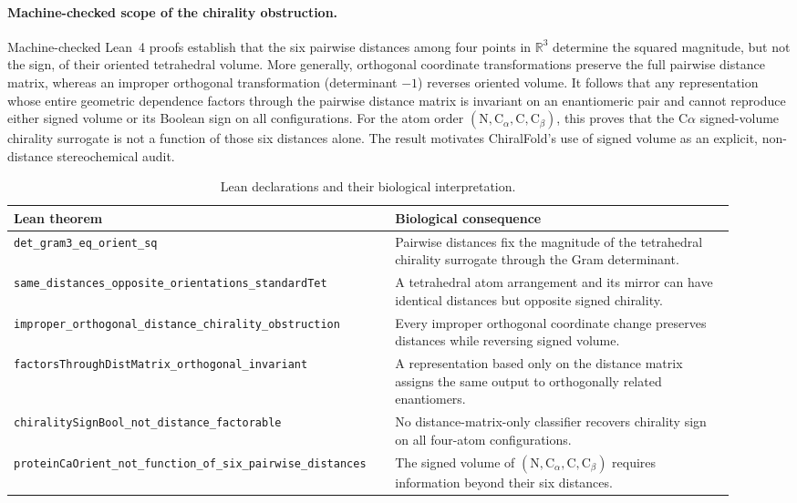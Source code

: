 \paragraph{Machine-checked scope of the chirality obstruction.}
Machine-checked Lean~4 proofs establish that the six pairwise distances among
four points in $\mathbb{R}^3$ determine the squared magnitude, but not the sign,
of their oriented tetrahedral volume.  More generally, orthogonal coordinate
transformations preserve the full pairwise distance matrix, whereas an improper
orthogonal transformation (determinant $-1$) reverses oriented volume.  It
follows that any representation whose entire geometric dependence factors
through the pairwise distance matrix is invariant on an enantiomeric pair and
cannot reproduce either signed volume or its Boolean sign on all configurations.
For the atom order $(\mathrm{N},\mathrm{C}_{\alpha},\mathrm{C},\mathrm{C}_{\beta})$,
this proves that the C$\alpha$ signed-volume chirality surrogate is not a
function of those six distances alone.  The result motivates ChiralFold's use of
signed volume as an explicit, non-distance stereochemical audit.

\begin{table}[t]
\centering
\caption{Lean declarations and their biological interpretation.}
\begin{tabular}{p{0.47\linewidth} p{0.45\linewidth}}
\hline
Lean theorem & Biological consequence \\
\hline
\texttt{det\_gram3\_eq\_orient\_sq} & Pairwise distances fix the magnitude of the tetrahedral chirality surrogate through the Gram determinant. \\
\texttt{same\_distances\_opposite\_orientations\_standardTet} & A tetrahedral atom arrangement and its mirror can have identical distances but opposite signed chirality. \\
\texttt{improper\_orthogonal\_distance\_chirality\_obstruction} & Every improper orthogonal coordinate change preserves distances while reversing signed volume. \\
\texttt{factorsThroughDistMatrix\_orthogonal\_invariant} & A representation based only on the distance matrix assigns the same output to orthogonally related enantiomers. \\
\texttt{chiralitySignBool\_not\_distance\_factorable} & No distance-matrix-only classifier recovers chirality sign on all four-atom configurations. \\
\texttt{proteinCaOrient\_not\_function\_of\_six\_pairwise\_distances} & The signed volume of $(\mathrm{N},\mathrm{C}_{\alpha},\mathrm{C},\mathrm{C}_{\beta})$ requires information beyond their six distances. \\
\hline
\end{tabular}
\end{table}

